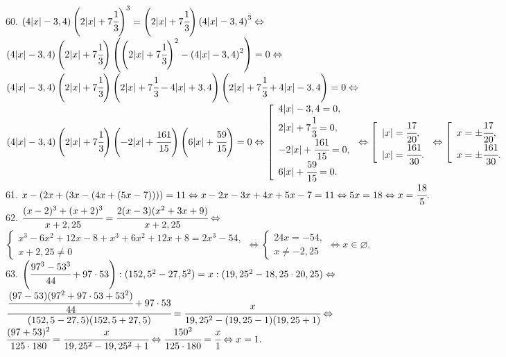 60. $\left(4|x|-3,4\right)\left(2|x|+7\cfrac{1}{3}\right)^3=\left(2|x|+7\cfrac{1}{3}\right)\left(4|x|-3,4\right)^3\Leftrightarrow$\\$
\left(4|x|-3,4\right)\left(2|x|+7\cfrac{1}{3}\right)\left(\left(2|x|+7\cfrac{1}{3}\right)^2-\left(4|x|-3,4\right)^2\right)=0\Leftrightarrow$\\$
\left(4|x|-3,4\right)\left(2|x|+7\cfrac{1}{3}\right)\left(2|x|+7\cfrac{1}{3}-4|x|+3,4\right)\left(2|x|+7\cfrac{1}{3}+4|x|-3,4\right)=0\Leftrightarrow$\\
$\left(4|x|-3,4\right)\left(2|x|+7\cfrac{1}{3}\right)\left(-2|x|+\cfrac{161}{15}\right)\left(6|x|+\cfrac{59}{15}\right)=0\Leftrightarrow
\left[\begin{array}{l}
4|x|-3,4=0,\\
2|x|+7\cfrac{1}{3}=0,\\
-2|x|+\cfrac{161}{15}=0,\\
6|x|+\cfrac{59}{15}=0.\end{array}\right.\Leftrightarrow \left[\begin{array}{l}
|x|=\cfrac{17}{20},\\
|x|=\cfrac{161}{30}.\end{array}\right.\Leftrightarrow \left[\begin{array}{l}
x=\pm\cfrac{17}{20},\\
x=\pm\cfrac{161}{30}.\end{array}\right.$\\
61. $x-(2x+(3x-(4x+(5x-7))))=11\Leftrightarrow x-2x-3x+4x+5x-7=11\Leftrightarrow5x=18\Leftrightarrow x=\cfrac{18}{5}.$\\
62. $\cfrac{(x-2)^3+(x+2)^3}{x+2,25}=\cfrac{2(x-3)(x^2+3x+9)}{x+2,25}\Leftrightarrow$\\$
\begin{cases} x^3-6x^2+12x-8+x^3+6x^2+12x+8=2x^3-54,\\ x+2,25\neq0\end{cases}\Leftrightarrow
\begin{cases} 24x=-54,\\ x\neq-2,25\end{cases}\Leftrightarrow x\in \varnothing.$\\
63. $\left(\cfrac{97^3-53^3}{44}+97\cdot 53\right): (152,5^2-27,5^2)=x:(19,25^2-18,25\cdot20,25)\Leftrightarrow$\\$
\cfrac{\cfrac{(97-53)(97^2+97\cdot53+53^2)}{44}+97\cdot 53}{(152,5-27,5)(152,5+27,5)}=\cfrac{x}{19,25^2-(19,25-1)(19,25+1)}\Leftrightarrow$\\
$\cfrac{(97+53)^2}{125\cdot180}=\cfrac{x}{19,25^2-19,25^2+1}\Leftrightarrow\cfrac{150^2}{125\cdot180}=\cfrac{x}{1}\Leftrightarrow x=1.$\\
